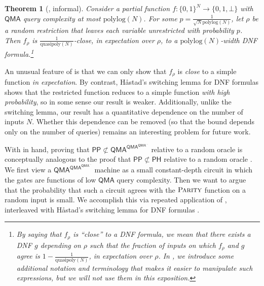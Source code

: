 \documentclass[11pt]{article}%
\newtheorem{theorem}{Theorem}
\newcommand{\polylog}{\mathrm{polylog}}
\newcommand{\quasipoly}{\mathrm{quasipoly}}
\newcommand{\PARITY}{\normalfont\textsc{Parity}}
\begin{document}
\begin{theorem}[, informal]
\label{thm:qma_random_restriction_intro}
Consider a partial function $f: \{0,1\}^N \to \{0,1,\bot\}$ with $\mathsf{QMA}$ query complexity at most $\polylog(N)$. For some $p = \frac{1}{\sqrt{N}\polylog(N)}$, let $\rho$ be a random restriction that leaves each variable unrestricted with probability $p$. Then $f_\rho$ is $\frac{1}{\quasipoly(N)}$-close, in expectation over $\rho$, to a $\polylog(N)$-width DNF formula.\footnote{By saying that $f_\rho$ is ``close'' to a DNF formula, we mean that there exists a DNF $g$ depending on $\rho$ such that the fraction of inputs on which $f_\rho$ and $g$ agree is $1 - \frac{1}{\quasipoly(N)}$, in expectation over $\rho$. In , we introduce some additional notation and terminology that makes it easier to manipulate such expressions, but we will not use them in this exposition.}
\end{theorem}

An unusual feature of  is that we can only show that $f_\rho$ is \textit{close} to a simple function \textit{in expectation}. By contrast, H\r{a}stad's switching lemma for DNF formulas \cite{Has87} shows that the restricted function reduces to a simple function \textit{with high probability}, so in some sense our result is weaker. Additionally, unlike the switching lemma, our result has a quantitative dependence on the number of inputs $N$. Whether this dependence can be removed (so that the bound depends only on the number of queries) remains an interesting problem for future work.

With  in hand, proving that $\mathsf{PP} \not\subset \mathsf{QMA}^{\mathsf{QMA}^{\mathsf{QMA}^{\cdots}}}$ relative to a random oracle is conceptually analogous to the proof that $\mathsf{PP} \not\subset \mathsf{PH}$ relative to a random oracle \cite{Has87}. We first view a $\mathsf{QMA}^{\mathsf{QMA}^{\mathsf{QMA}^{\cdots}}}$ machine as a small constant-depth circuit in which the gates are functions of low $\mathsf{QMA}$ query complexity. Then we want to argue that the probability that such a circuit agrees with the $\PARITY$ function on a random input is small. We accomplish this via repeated application of , interleaved with H\r{a}stad's switching lemma for DNF formulas \cite{Has87}.
\end{document}
